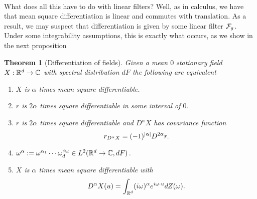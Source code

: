 \documentclass[12pt]{article}
\newtheorem{theorem}{Theorem}
\begin{document}
\\
What does all this have to do with linear filters? Well, as in calculus, we have that mean square differentiation is linear and commutes with translation. As a result, we may suspect that differentiation is given by some linear filter $\mathcal{F}_g$. Under some integrability assumptions, this is exactly what occurs, as we show in the next proposition
\begin{theorem}[Differentiation of fields]\label{diff fields theorem}
	Given a mean $0$ stationary  field $X:{\mathbb R}^d\to\mathbb{C}$ with spectral distribution $dF$ the following are equivalent
	\begin{enumerate}
		\item $X$ is $\alpha$ times mean square differentiable.
		\item $r$ is $2\alpha$ times square differentiable in some interval of $0$.
		\item $r$ is $2\alpha$ times square differentiable and $D^\alpha X$ has covariance function
		      \begin{equation*}
			      r_{D^\alpha X}=(-1)^{\abs{\alpha}}D^{2\alpha}r.
		      \end{equation*}
		\item $\omega^\alpha:=\omega^{\alpha_1}\cdots \omega_d^{\alpha_d}\in L^2({\mathbb R}^d\to\mathbb{C},dF)$.
		\item $X$ is $\alpha$ times mean square differentiable with
		      \begin{equation}\label{deriv X equation}
			      D^\alpha X(u)=\int_{{\mathbb R}^d}(i\omega)^{\alpha}e^{i\omega\cdot u}dZ(\omega).
		      \end{equation}
	\end{enumerate}
\end{theorem}
\end{document}
